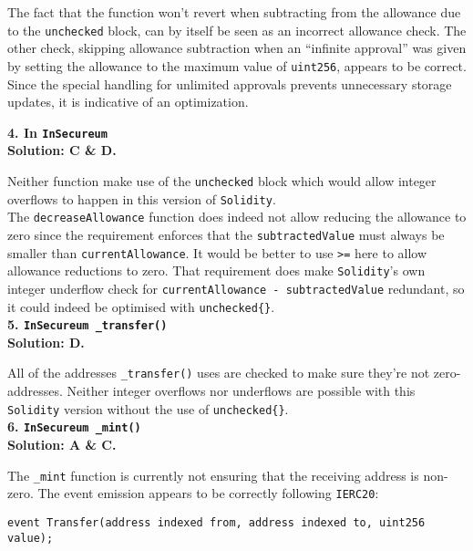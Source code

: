 The fact that the function won't revert when subtracting from the allowance due to the \verb|unchecked| block, can by itself be seen as an incorrect allowance check.
The other check, skipping allowance subtraction when an ``infinite approval'' was given by setting the allowance to the maximum value of \verb|uint256|, appears to be correct.
Since the special handling for unlimited approvals prevents unnecessary storage updates, it is indicative of an optimization.\\

\pagebreak

\textbf{4. In \texttt{InSecureum}}\label{sec:race4_q4}\\

\textbf{Solution: C \& D.}

Neither function make use of the \verb|unchecked| block which would allow integer overflows to happen in this version of \verb|Solidity|.\\

The \verb|decreaseAllowance| function does indeed not allow reducing the allowance to zero since the requirement enforces that the \verb|subtractedValue| must always be smaller than \verb|currentAllowance|.
It would be better to use \verb|>=| here to allow allowance reductions to zero.
That requirement does make \verb|Solidity|'s own integer underflow check for \verb|currentAllowance - subtractedValue| redundant, so it could indeed be optimised with \verb|unchecked{}|.\\

\textbf{5. \texttt{InSecureum \_transfer()}}\label{sec:race4_q5}\\

\textbf{Solution: D.}

All of the addresses \verb|_transfer()| uses are checked to make sure they're not zero-addresses.
Neither integer overflows nor underflows are possible with this \verb|Solidity| version without the use of \verb|unchecked{}|.\\

\textbf{6. \texttt{InSecureum \_mint()}}\label{sec:race4_q6}\\

\textbf{Solution: A \& C.}

The \verb|_mint| function is currently not ensuring that the receiving address is non-zero.
The event emission appears to be correctly following \verb|IERC20|:

\begin{lstlisting}[language=Solidity, style=solStyle]
event Transfer(address indexed from, address indexed to, uint256 value);
\end{lstlisting}

